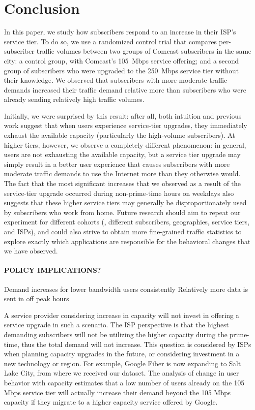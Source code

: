 \section{Conclusion}\label{sec:conclusion}

In this paper, we study how subscribers respond to an increase in their
ISP's service tier. To do so, we use a randomized control trial that compares
per-subscriber traffic volumes between two groups of Comcast subscribers
in the same city: a control group, with Comcast's 105~Mbps service
offering; and a second group of subscribers who were upgraded to the
250~Mbps service tier without their knowledge.  We observed that
subscribers with more moderate traffic demands increased their traffic
demand relative more than subscribers who were already sending
relatively high traffic volumes.  

Initially, we were surprised by this result: after all, both intuition
and previous work suggest that when users experience service-tier
upgrades, they immediately exhaust the available capacity (particularly
the high-volume subscribers). At higher tiers, however, we observe a
completely different phenomenon: in general, users are not exhausting
the available capacity, but a service tier upgrade may simply result in
a better user experience that causes subscribers with more moderate
traffic demands to use the Internet more than they otherwise would.  The
fact that the most significant increases that we observed as a result of
the service-tier upgrade occurred during non-prime-time hours on
weekdays also suggests that these higher service tiers may generally be
disproportionately used by subscribers who work from home.  Future
research should aim to repeat our experiment for different cohorts (\ie,
different subscribers, geographies, service tiers, and ISPs), and could
also strive to obtain more fine-grained traffic statistics to explore
exactly which applications are responsible for the behavioral changes
that we have observed.


\paragraph{POLICY IMPLICATIONS?}

Demand increases for lower bandwidth users consistently
Relatively more data is sent in off peak hours 

A service provider considering increase in 
capacity will not invest in offering a service upgrade in such a scenario. The 
ISP perspective is that the highest demanding subscribers will not be utilizing 
the higher capacity during the prime-time, thus the total demand will not 
increase. This question is considered by ISPs when planning capacity upgrades 
in the future, or considering investment in a new technology or region. For 
example, Google Fiber is now expanding to Salt Lake City, from where 
we received our dataset. The analysis of change in user behavior with capacity 
estimates that a low number of users already on the 105 Mbps service tier will 
actually increase their demand beyond the 105 Mbps capacity if they 
migrate to a higher capacity service offered by Google. 

